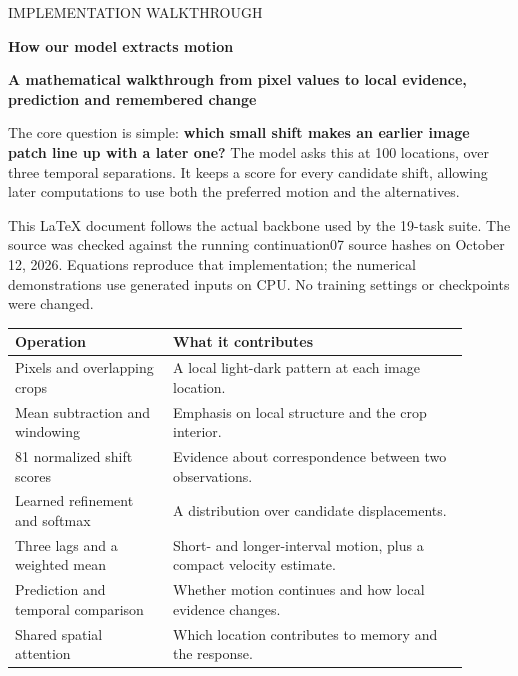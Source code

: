 \documentclass[11pt,letterpaper]{article}
\begin{document}
\fontsize{10.5}{13.6}\selectfont
\color{navy}
\label{guide}

{\color{teal}\small\sffamily IMPLEMENTATION WALKTHROUGH\par}\medskip

{\sffamily\bfseries\fontsize{27}{32}\selectfont How our model extracts motion\par}\bigskip

\textbf{A mathematical walkthrough from pixel values to local evidence, prediction and remembered change}


The core question is simple: \textbf{which small shift makes an earlier image patch line up with a later one?} The model asks this at 100 locations, over three temporal separations. It keeps a score for every candidate shift, allowing later computations to use both the preferred motion and the alternatives.


This LaTeX document follows the actual backbone used by the 19-task suite. The source was checked against the running continuation07 source hashes on October 12, 2026. Equations reproduce that implementation; the numerical demonstrations use generated inputs on CPU. No training settings or checkpoints were changed.


\begin{center}\small\renewcommand{\arraystretch}{1.16}\setlength{\tabcolsep}{4pt}\begin{tabular}{p{0.316\linewidth}p{0.584\linewidth}}\toprule

\textbf{Operation} & \textbf{What it contributes} \\

\midrule

Pixels and overlapping crops & A local light-dark pattern at each image location. \\

Mean subtraction and windowing & Emphasis on local structure and the crop interior. \\

81 normalized shift scores & Evidence about correspondence between two observations. \\

Learned refinement and softmax & A distribution over candidate displacements. \\

Three lags and a weighted mean & Short- and longer-interval motion, plus a compact velocity estimate. \\

Prediction and temporal comparison & Whether motion continues and how local evidence changes. \\

Shared spatial attention & Which location contributes to memory and the response. \\

\bottomrule\end{tabular}\end{center}
\end{document}

